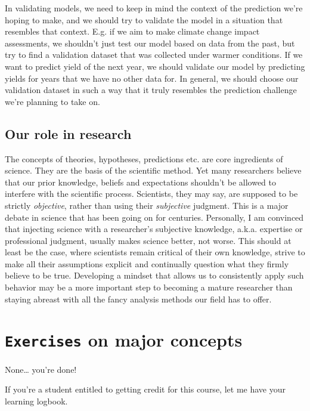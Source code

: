 \documentclass[
]{book}
\begin{document}
In validating models, we need to keep in mind the context of the prediction we're hoping to make, and we should try to validate the model in a situation that resembles that context. E.g. if we aim to make climate change impact assessments, we shouldn't just test our model based on data from the past, but try to find a validation dataset that was collected under warmer conditions. If we want to predict yield of the next year, we should validate our model by predicting yields for years that we have no other data for. In general, we should choose our validation dataset in such a way that it truly resembles the prediction challenge we're planning to take on.

\hypertarget{our-role-in-research}{%
\subsection{Our role in research}\label{our-role-in-research}}

The concepts of theories, hypotheses, predictions etc. are core ingredients of science. They are the basis of the scientific method. Yet many researchers believe that our prior knowledge, beliefs and expectations shouldn't be allowed to interfere with the scientific process. Scientists, they may say, are supposed to be strictly \emph{objective}, rather than using their \emph{subjective} judgment. This is a major debate in science that has been going on for centuries. Personally, I am convinced that injecting science with a researcher's subjective knowledge, a.k.a. expertise or professional judgment, usually makes science better, not worse. This should at least be the case, where scientists remain critical of their own knowledge, strive to make all their assumptions explicit and continually question what they firmly believe to be true. Developing a mindset that allows us to consistently apply such behavior may be a more important step to becoming a mature researcher than staying abreast with all the fancy analysis methods our field has to offer.

\hypertarget{ex_majorconcepts}{%
\section*{\texorpdfstring{\texttt{Exercises} on major concepts}{Exercises on major concepts}}\label{ex_majorconcepts}}

None\ldots{} you're done!

If you're a student entitled to getting credit for this course, let me have your learning logbook.
\end{document}
